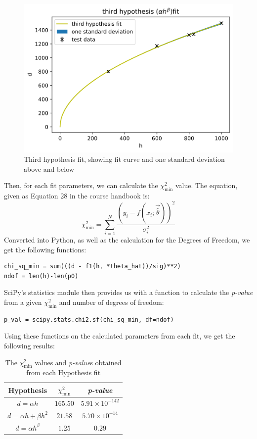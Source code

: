 \documentclass[a4paper]{article}
\begin{document}
\begin{figure}[htb!]
\centerline{\includegraphics[scale=0.7]{h3.png}}
\caption{Third hypothesis fit, showing fit curve and one standard deviation above and below}
\label{fig:fit3}
\end{figure}
\newpage
Then, for each fit parameters, we can calculate the $\chi^2_\text{min}$ value. The equation, given as Equation 28 in the course handbook is:
\begin{equation} \label{eq:1}
\chi^2_\text{min}=\sum^N_{i=1}\frac{(y_i-f(x_i;\vec{\hat\theta}))^2}{\sigma^2_i}
\end{equation}
Converted into Python, as well as the calculation for the Degrees of Freedom, we get the following functions:
\newpage
\begin{lstlisting}
chi_sq_min = sum(((d - f1(h, *theta_hat))/sig)**2)
ndof = len(h)-len(p0)
\end{lstlisting}
SciPy's statistics module then provides us with a function to calculate the {\it p-value} from a given $\chi^2_\text{min}$ and number of degrees of freedom:
\begin{lstlisting}
p_val = scipy.stats.chi2.sf(chi_sq_min, df=ndof)
\end{lstlisting}
Using these functions on the calculated parameters from each fit, we get the following results:

\begin{table}[t!]
\centering
\begin{tabular}{ccc}
Hypothesis & $\chi^2_\text{min}$ & {\it p-value}\\ \hline\hline
$d=\alpha h$            & $165.50$ & $5.91\times10^{-142}$ \\
$d=\alpha h+\beta h^2$  & $21.58$  & $5.70\times10^{-14}$ \\
$d=\alpha h^\beta$      & $1.25$   & $0.29$  \\\hline
\end{tabular}
\caption{\label{tab:table}The $\chi^2_\text{min}$ values and {\it p-value}s obtained from each Hypothesis fit}
\end{table}
\end{document}
